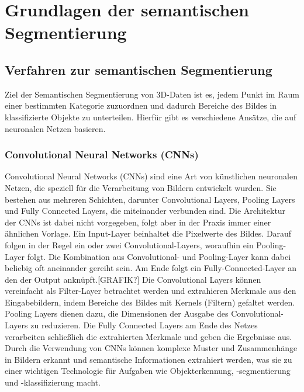\chapter{Grundlagen der semantischen Segmentierung}

\section{Verfahren zur semantischen Segmentierung}

Ziel der Semantischen Segmentierung von 3D-Daten ist es, jedem Punkt im Raum
einer bestimmten Kategorie zuzuordnen und dadurch Bereiche des Bildes in
klassifizierte Objekte zu unterteilen. Hierfür gibt es verschiedene Ansätze,
die auf neuronalen Netzen basieren.

\subsection{Convolutional Neural Networks (CNNs)}
Convolutional Neural Networks (CNNs) sind eine Art von künstlichen neuronalen
Netzen, die speziell für die Verarbeitung von Bildern entwickelt wurden. Sie
bestehen aus mehreren Schichten, darunter Convolutional Layers, Pooling Layers
und Fully Connected Layers, die miteinander verbunden sind. Die Architektur der
CNNs ist dabei nicht vorgegeben, folgt aber in der Praxis immer einer ähnlichen
Vorlage. Ein Input-Layer beinhaltet die Pixelwerte des Bildes. Darauf folgen in
der Regel ein oder zwei Convolutional-Layers, woraufhin ein Pooling-Layer
folgt. Die Kombination aus Convolutional- und Pooling-Layer kann dabei beliebig
oft aneinander gereiht sein. Am Ende folgt ein Fully-Connected-Layer an den der
Output anknüpft.[GRAFIK?] Die Convolutional Layers können vereinfacht als
Filter-Layer betrachtet werden und extrahieren Merkmale aus den Eingabebildern,
indem Bereiche des Bildes mit Kernels (Filtern) gefaltet werden. Pooling Layers
dienen dazu, die Dimensionen der Ausgabe des Convolutional-Layers zu
reduzieren. Die Fully Connected Layers am Ende des Netzes verarbeiten
schließlich die extrahierten Merkmale und geben die Ergebnisse aus. Durch die
Verwendung von CNNs können komplexe Muster und Zusammenhänge in Bildern erkannt
und semantische Informationen extrahiert werden, was sie zu einer wichtigen
Technologie für Aufgaben wie Objekterkennung, -segmentierung und
-klassifizierung macht.

